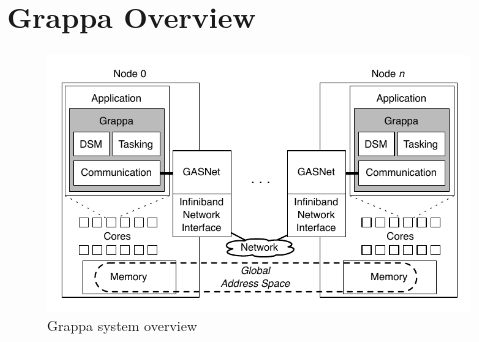 \section{Grappa Overview}

\begin{figure}[t]
\begin{center}
  \includegraphics[width=0.95\columnwidth]{figs/system-overview}
\begin{minipage}{0.95\columnwidth}
  \caption{\label{fig:grappa} Grappa system overview}
\end{minipage}
\vspace{-3ex}
\end{center}
\end{figure}



